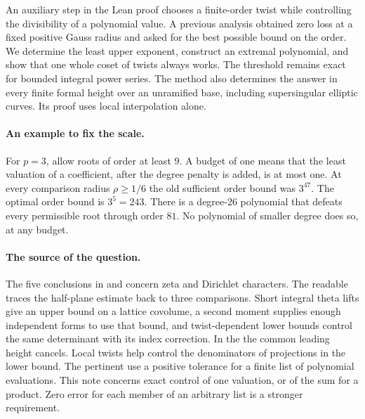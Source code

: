 \documentclass[11pt]{article}
\begin{document}
An auxiliary step in the Lean proof chooses a finite-order twist while
controlling the divisibility of a polynomial value. A previous analysis
obtained zero loss at a fixed positive Gauss radius and asked for the
best possible bound on the order. We determine the least upper exponent,
construct an extremal polynomial, and show that one whole coset of
twists always works. The threshold remains exact for bounded integral
power series. The method also determines the answer in every finite
formal height over an unramified base, including supersingular elliptic
curves. Its proof uses local interpolation alone.

\paragraph{An example to fix the scale.}
For $p=3$, allow roots of order at least $9$. A budget of one means that
the least valuation of a coefficient, after the degree penalty is
added, is at most one. At every comparison radius $\rho\ge1/6$ the old
sufficient order bound was $3^{47}$. The optimal order bound is
$3^5=243$. There is a degree-26 polynomial that defeats every permissible
root through order $81$. No polynomial of smaller degree does so, at
any budget.

\paragraph{The source of the question.}
The five conclusions in  and
 concern zeta and Dirichlet characters.
The readable  traces the half-plane
estimate back to three comparisons. Short integral theta lifts give
an upper bound on a lattice covolume, a second moment supplies enough
independent forms to use that bound, and twist-dependent lower bounds
control the same determinant with its index correction. In the
 the
common leading height cancels. Local twists help control the denominators
of projections in the lower bound. The pertinent
 use a positive tolerance for a finite list of polynomial
evaluations. This note concerns exact control of one valuation, or of
the sum for a product. Zero error for each member of an arbitrary list
is a stronger requirement.
\end{document}

